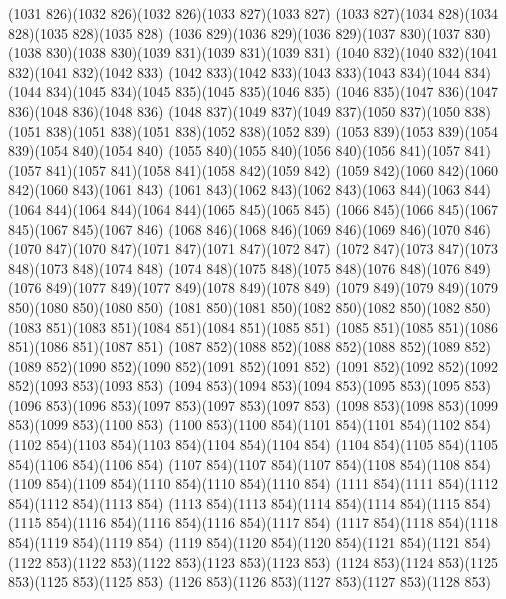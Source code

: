 \cpath (1031 826)(1032 826)(1032 826)(1033 827)(1033 827)
\cpath (1033 827)(1034 828)(1034 828)(1035 828)(1035 828)
\cpath (1036 829)(1036 829)(1036 829)(1037 830)(1037 830)
\cpath (1038 830)(1038 830)(1039 831)(1039 831)(1039 831)
\cpath (1040 832)(1040 832)(1041 832)(1041 832)(1042 833)
\cpath (1042 833)(1042 833)(1043 833)(1043 834)(1044 834)
\cpath (1044 834)(1045 834)(1045 835)(1045 835)(1046 835)
\cpath (1046 835)(1047 836)(1047 836)(1048 836)(1048 836)
\cpath (1048 837)(1049 837)(1049 837)(1050 837)(1050 838)
\cpath (1051 838)(1051 838)(1051 838)(1052 838)(1052 839)
\cpath (1053 839)(1053 839)(1054 839)(1054 840)(1054 840)
\cpath (1055 840)(1055 840)(1056 840)(1056 841)(1057 841)
\cpath (1057 841)(1057 841)(1058 841)(1058 842)(1059 842)
\cpath (1059 842)(1060 842)(1060 842)(1060 843)(1061 843)
\cpath (1061 843)(1062 843)(1062 843)(1063 844)(1063 844)
\cpath (1064 844)(1064 844)(1064 844)(1065 845)(1065 845)
\cpath (1066 845)(1066 845)(1067 845)(1067 845)(1067 846)
\cpath (1068 846)(1068 846)(1069 846)(1069 846)(1070 846)
\cpath (1070 847)(1070 847)(1071 847)(1071 847)(1072 847)
\cpath (1072 847)(1073 847)(1073 848)(1073 848)(1074 848)
\cpath (1074 848)(1075 848)(1075 848)(1076 848)(1076 849)
\cpath (1076 849)(1077 849)(1077 849)(1078 849)(1078 849)
\cpath (1079 849)(1079 849)(1079 850)(1080 850)(1080 850)
\cpath (1081 850)(1081 850)(1082 850)(1082 850)(1082 850)
\cpath (1083 851)(1083 851)(1084 851)(1084 851)(1085 851)
\cpath (1085 851)(1085 851)(1086 851)(1086 851)(1087 851)
\cpath (1087 852)(1088 852)(1088 852)(1088 852)(1089 852)
\cpath (1089 852)(1090 852)(1090 852)(1091 852)(1091 852)
\cpath (1091 852)(1092 852)(1092 852)(1093 853)(1093 853)
\cpath (1094 853)(1094 853)(1094 853)(1095 853)(1095 853)
\cpath (1096 853)(1096 853)(1097 853)(1097 853)(1097 853)
\cpath (1098 853)(1098 853)(1099 853)(1099 853)(1100 853)
\cpath (1100 853)(1100 854)(1101 854)(1101 854)(1102 854)
\cpath (1102 854)(1103 854)(1103 854)(1104 854)(1104 854)
\cpath (1104 854)(1105 854)(1105 854)(1106 854)(1106 854)
\cpath (1107 854)(1107 854)(1107 854)(1108 854)(1108 854)
\cpath (1109 854)(1109 854)(1110 854)(1110 854)(1110 854)
\cpath (1111 854)(1111 854)(1112 854)(1112 854)(1113 854)
\cpath (1113 854)(1113 854)(1114 854)(1114 854)(1115 854)
\cpath (1115 854)(1116 854)(1116 854)(1116 854)(1117 854)
\cpath (1117 854)(1118 854)(1118 854)(1119 854)(1119 854)
\cpath (1119 854)(1120 854)(1120 854)(1121 854)(1121 854)
\cpath (1122 853)(1122 853)(1122 853)(1123 853)(1123 853)
\cpath (1124 853)(1124 853)(1125 853)(1125 853)(1125 853)
\cpath (1126 853)(1126 853)(1127 853)(1127 853)(1128 853)
